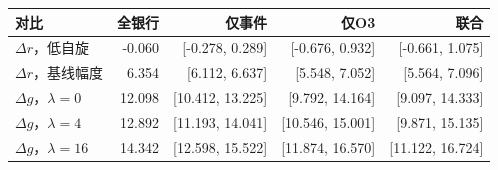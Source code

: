 \begin{tabular}{lrrrr}
\toprule
对比 & 全银行 & 仅事件 & 仅O3 & 联合 \\
\midrule
$\Delta r$，低自旋 & -0.060 & [-0.278, 0.289] & [-0.676, 0.932] & [-0.661, 1.075] \\
$\Delta r$，基线幅度 & 6.354 & [6.112, 6.637] & [5.548, 7.052] & [5.564, 7.096] \\
$\Delta g$，$\lambda=0$ & 12.098 & [10.412, 13.225] & [9.792, 14.164] & [9.097, 14.333] \\
$\Delta g$，$\lambda=4$ & 12.892 & [11.193, 14.041] & [10.546, 15.001] & [9.871, 15.135] \\
$\Delta g$，$\lambda=16$ & 14.342 & [12.598, 15.522] & [11.874, 16.570] & [11.122, 16.724] \\
\bottomrule
\end{tabular}
